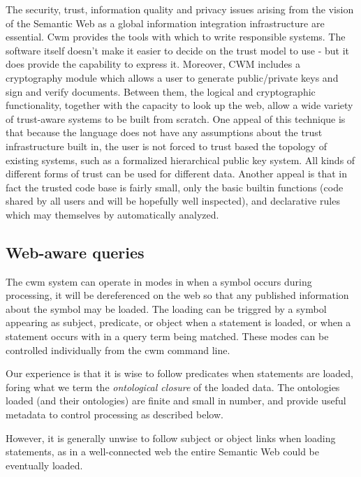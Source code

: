 \documentclass{tlp}
\begin{document}
\par \empty The security, trust, information
quality and privacy issues arising from the vision of the Semantic
Web as a global information integration infrastructure are
essential. Cwm provides the tools with which to write responsible
systems. The software itself doesn't make it easier to decide on
the trust model to use - but it does provide the capability to
express it. Moreover, CWM includes a cryptography module which
allows a user to generate public/private keys and sign and verify
documents. Between them, the logical and cryptographic
functionality, together with the capacity to look up the web, allow
a wide variety of trust-aware systems to be built from scratch. One
appeal of this technique is that because the language does not have
any assumptions about the trust infrastructure built in, the user
is not forced to trust based the topology of existing systems, such
as a formalized hierarchical public key system. All kinds of
different forms of trust can be used for different data. Another
appeal is that in fact the trusted code base is fairly small, only
the basic builtin functions (code shared by all users and will be
hopefully well inspected), and declarative rules which may
themselves by automatically analyzed.
\subsection{Web-aware queries}
  

\par The cwm system can operate in modes in when a symbol occurs
during processing, it will be dereferenced on the web so that any
published information about the symbol may be loaded. The loading
can be triggred by a symbol appearing as subject, predicate, or
object when a statement is loaded, or when a statement occurs with
in a query term being matched. These modes can be controlled
individually from the cwm command line.

\par Our experience is that it is wise to follow predicates when
statements are loaded, foring what we term the {\em ontological
closure} of the loaded data. The ontologies loaded (and their
ontologies) are finite and small in number, and provide useful
metadata to control processing as described below.

\par However, it is generally unwise to follow subject or object
links when loading statements, as in a well-connected web the
entire Semantic Web could be eventually loaded.
\end{document}
